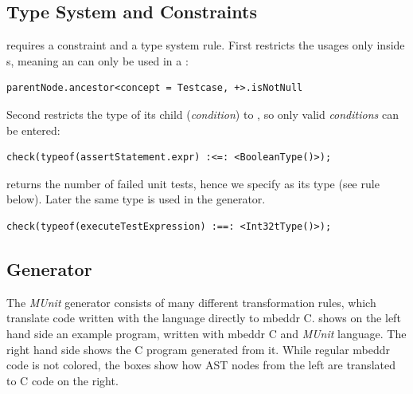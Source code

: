 \subsection{Type System and Constraints}

 requires a constraint and a type
system rule. First restricts the usages only inside s, meaning an
 can only be used in a :
\begin{lstlisting}[language=constraintsAndTS,frame=single]
parentNode.ancestor<concept = Testcase, +>.isNotNull
\end{lstlisting}

Second restricts the type of its child  (\emph{condition}) to
, so only valid \emph{conditions} can be entered:
\begin{lstlisting}[language=constraintsAndTS,frame=single]
check(typeof(assertStatement.expr) :<=: <BooleanType()>);
\end{lstlisting}

 returns the number of failed unit tests,  
hence we specify  as its type (see rule below). Later the same
type is used in the generator.

\begin{lstlisting}[language=constraintsAndTS,frame=single]
check(typeof(executeTestExpression) :==: <Int32tType()>);
\end{lstlisting}


\subsection{Generator}

The \emph{MUnit} generator consists of many different transformation rules,
which translate code written with the language directly to mbeddr C.  shows
on the left hand side an example program, written with mbeddr C and
\emph{MUnit} language. The right hand side shows the C program generated from
it.
While regular mbeddr code is not colored, the boxes show how \ac{AST} nodes from the
left are translated to C code on the right.

